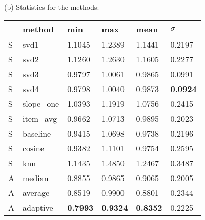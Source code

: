 \begin{table}
  \vspace{1em}
  
  (b) Statistics for the methods:

  \vspace{0.4em}

  \begin{tabular*}{0.47\textwidth}{ l p{2cm} l l l l }
    \hline
    { } & method & min & max & mean & $\sigma$ \\
    \hline
    S & svd1          & 1.1045	& 1.2389	& 1.1441	& 0.2197 \\
    S & svd2          & 1.1260	& 1.2630	& 1.1605	& 0.2277 \\
    S & svd3          & 0.9797	& 1.0061	& 0.9865	& 0.0991 \\
    S & svd4          & 0.9798	& 1.0040	& 0.9873	& \textbf{0.0924} \\
    S & slope\_one    & 1.0393	& 1.1919	& 1.0756	& 0.2415 \\
    S & item\_avg     & 0.9662	& 1.0713	& 0.9895	& 0.2023 \\
    S & baseline       & 0.9415	& 1.0698	& 0.9738	& 0.2196 \\
    S & cosine   	    & 0.9382	& 1.1101	& 0.9754	& 0.2595 \\
    S & knn       	  & 1.1435	& 1.4850	& 1.2467	& 0.3487 \\
    \hline            
    A & median    	  & 0.8855	& 0.9865	& 0.9065	& 0.2005 \\
    A & average    	  & 0.8519	& 0.9900	& 0.8801	& 0.2344 \\
    A & adaptive       & \textbf{0.7993}	& \textbf{0.9324}	& \textbf{0.8352}	& 0.2225 \\
    \hline
  \end{tabular*}
  \label{table:results:e1}
\end{table}

